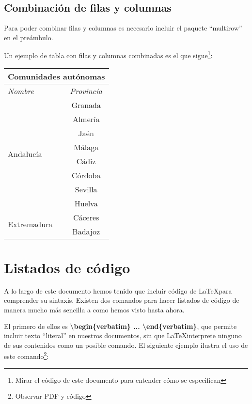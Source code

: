 \subsection{Combinación de filas y columnas}

Para poder combinar filas y columnas es necesario incluir el paquete ``multirow'' en el preámbulo.

Un ejemplo de tabla con filas y columnas combinadas es el que sigue\footnote{Mirar el código de este documento para entender cómo se especifican}:

\begin{tabular}{ |l||c|  }
 \hline
 \multicolumn{2}{|c|}{\textbf{Comunidades autónomas}} \\
 \hline
  \emph{Nombre} & \emph{Provincia}\\
 \hline
 \multirow{8}{*}{Andalucía} & Granada\\
 \cline{2 - 2} %
 	& Almería\\
 \cline{2 - 2}
 	& Jaén\\
 \cline{2 - 2}
 	& Málaga\\
 \cline{2 - 2}
 	& Cádiz\\
 \cline{2 - 2}
 	& Córdoba\\
 \cline{2 - 2}
 	& Sevilla\\
 \cline{2 - 2}
 	& Huelva\\
 \hline
 \multirow{2}{*}{Extremadura} & Cáceres\\
 \cline{2 - 2} %
 	& Badajoz\\
 \hline
\end{tabular}

\section{Listados de código}

A lo largo de este documento hemos tenido que incluir código de \LaTeX para comprender su sintaxis. Existen dos comandos para hacer listados de código de manera mucho más sencilla a como hemos visto hasta ahora.

El primero de ellos es \textbf{\textbackslash begin\{verbatim\} ... \textbackslash end\{verbatim\}}, que permite incluir texto ``literal'' en nuestros documentos, sin que \LaTeX interprete ninguno de sus contenidos como un posible comando. El siguiente ejemplo ilustra el uso de este comando\footnote{Observar PDF y código}:

